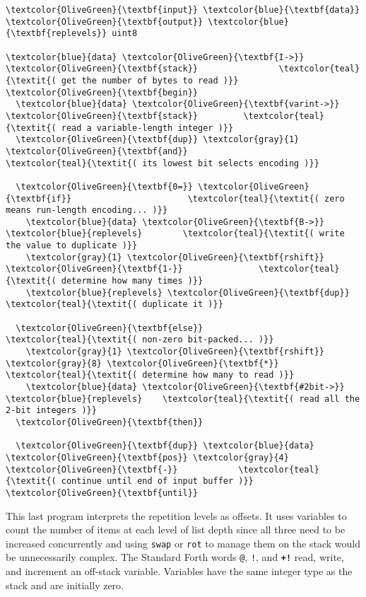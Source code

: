 \documentclass{webofc}
\begin{document}
\begin{Verbatim}[commandchars=\\\{\}]
\textcolor{OliveGreen}{\textbf{input}} \textcolor{blue}{\textbf{data}}
\textcolor{OliveGreen}{\textbf{output}} \textcolor{blue}{\textbf{replevels}} uint8

\textcolor{blue}{data} \textcolor{OliveGreen}{\textbf{I->}} \textcolor{OliveGreen}{\textbf{stack}}                \textcolor{teal}{\textit{( get the number of bytes to read )}}
\textcolor{OliveGreen}{\textbf{begin}}
  \textcolor{blue}{data} \textcolor{OliveGreen}{\textbf{varint->}} \textcolor{OliveGreen}{\textbf{stack}}         \textcolor{teal}{\textit{( read a variable-length integer )}}
  \textcolor{OliveGreen}{\textbf{dup}} \textcolor{gray}{1} \textcolor{OliveGreen}{\textbf{and}}                   \textcolor{teal}{\textit{( its lowest bit selects encoding )}}

  \textcolor{OliveGreen}{\textbf{0=}} \textcolor{OliveGreen}{\textbf{if}}                       \textcolor{teal}{\textit{( zero means run-length encoding... )}}
    \textcolor{blue}{data} \textcolor{OliveGreen}{\textbf{B->}} \textcolor{blue}{replevels}        \textcolor{teal}{\textit{( write the value to duplicate )}}
    \textcolor{gray}{1} \textcolor{OliveGreen}{\textbf{rshift}} \textcolor{OliveGreen}{\textbf{1-}}               \textcolor{teal}{\textit{( determine how many times )}}
    \textcolor{blue}{replevels} \textcolor{OliveGreen}{\textbf{dup}}             \textcolor{teal}{\textit{( duplicate it )}}

  \textcolor{OliveGreen}{\textbf{else}}                        \textcolor{teal}{\textit{( non-zero bit-packed... )}}
    \textcolor{gray}{1} \textcolor{OliveGreen}{\textbf{rshift}} \textcolor{gray}{8} \textcolor{OliveGreen}{\textbf{*}}              \textcolor{teal}{\textit{( determine how many to read )}}
    \textcolor{blue}{data} \textcolor{OliveGreen}{\textbf{#2bit->}} \textcolor{blue}{replevels}    \textcolor{teal}{\textit{( read all the 2-bit integers )}}
  \textcolor{OliveGreen}{\textbf{then}}

  \textcolor{OliveGreen}{\textbf{dup}} \textcolor{blue}{data} \textcolor{OliveGreen}{\textbf{pos}} \textcolor{gray}{4} \textcolor{OliveGreen}{\textbf{-}}            \textcolor{teal}{\textit{( continue until end of input buffer )}}
\textcolor{OliveGreen}{\textbf{until}}
\end{Verbatim}

\noindent This last program interprets the repetition levels as offsets. It uses variables to count the number of items at each level of list depth since all three need to be increased concurrently and using \texttt{swap} or \texttt{rot} to manage them on the stack would be unnecessarily complex. The Standard Forth words \texttt{@}, \texttt{!}, and \textcolor{OliveGreen}{\tt\textbf{+!}} read, write, and increment an off-stack variable. Variables have the same integer type as the stack and are initially zero.
\end{document}
